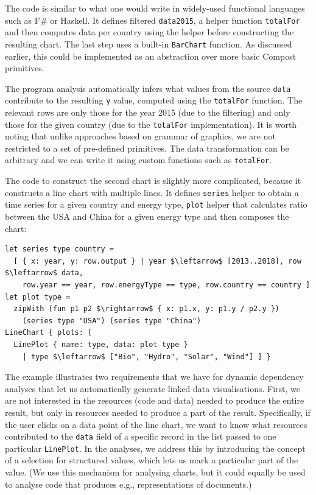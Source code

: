 \documentclass[fleqn,11pt]{report}
\theoremstyle{definition}
\begin{document}
The code is similar to what one would write in widely-used functional languages such as
F\# or Haskell. It defines filtered \texttt{data2015}, a helper function \texttt{totalFor}
and then computes data per country using the helper before constructing the resulting chart.
The last step uses a built-in \texttt{BarChart} function. As discussed earlier, this could be
implemented as an abstraction over more basic Compost primitives.

The program analysis automatically infers what values from the source \texttt{data}
contribute to the resulting \texttt{y} value, computed using the \texttt{totalFor} function.
The relevant rows are only those for the year 2015 (due to the filtering) and only those for
the given country (due to the \texttt{totalFor} implementation). It is worth noting that unlike
approaches based on grammar of graphics, we are not restricted to a set of pre-defined primitives.
The data transformation can be arbitrary and we can write it using custom functions such as
\texttt{totalFor}.

The code to construct the second chart is slightly more complicated, because it constructs a
line chart with multiple lines. It defines \texttt{series} helper to obtain a time series for
a given country and energy type, \texttt{plot} helper that calculates ratio between the USA and
China for a given energy type and then composes the chart:
%
\begin{lstlisting}[language=fluid,mathescape=true]
let series type country =
  [ { x: year, y: row.output } | year $\leftarrow$ [2013..2018], row $\leftarrow$ data,
    row.year == year, row.energyType == type, row.country == country ]
let plot type =
  zipWith (fun p1 p2 $\rightarrow$ { x: p1.x, y: p1.y / p2.y })
    (series type "USA") (series type "China")
LineChart { plots: [
  LinePlot { name: type, data: plot type }
    | type $\leftarrow$ ["Bio", "Hydro", "Solar", "Wind"] ] }
\end{lstlisting}
%
The example illustrates two requirements that we have for dynamic dependency analyses that
let us automatically generate linked data visualisations. First, we are not interested in the
resources (code and data) needed to produce the entire result, but only in resources needed to
produce a part of the result. Specifically, if the user clicks on a data point of the line chart,
we want to know what resources contributed to the \texttt{data} field of a specific record in the
list passed to one particular \texttt{LinePlot}. In the analyses, we address this by introducing
the concept of a selection for structured values, which lets us mark a particular part of the
value. (We use this mechanism for analysing charts, but it could equally be used to analyse code
that produces e.g., representations of documents.)
\end{document}
